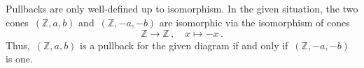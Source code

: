 \subsection{}

Pullbacks are only well-defined up to isomorphism.
In the given situation, the two cones~$(ℤ, a, b)$ and~$(ℤ, -a, -b)$ are isomorphic via the isomorphism of cones
\[
	ℤ \to ℤ \,,
	\quad
	x \mapsto -x \,.
\]
Thus,~$(ℤ, a, b)$ is a pullback for the given diagram if and only if~$(ℤ, -a, -b)$ is one.
